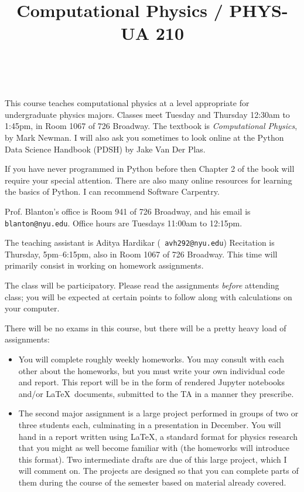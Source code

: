 \documentclass[11pt, preprint]{aastex}
\begin{document}
\title{\bf Computational Physics / PHYS-UA 210}
~
~

\noindent This course teaches computational physics at a level
appropriate for undergraduate physics majors.  Classes meet Tuesday
and Thursday 12:30am to 1:45pm, in Room 1067 of 726 Broadway.  The
textbook is {\it Computational Physics}, by Mark Newman. I will also
ask you sometimes to look online at the Python Data Science Handbook
(PDSH) by Jake Van Der Plas.

\noindent If you have never programmed in Python before then Chapter 2
of the book will require your special attention. There are also many
online resources for learning the basics of Python. I can recommend
Software Carpentry.

\noindent Prof. Blanton's office is Room 941 of 726 Broadway, and his
email is {\tt blanton@nyu.edu}.  Office hours are Tuesdays 11:00am to
12:15pm.

\noindent The teaching assistant is Aditya Hardikar ({\tt
  avh292@nyu.edu}) Recitation is Thursday, 5pm--6:15pm, also in Room
1067 of 726 Broadway. This time will primarily consist in working on
homework assignments.

\noindent The class will be participatory. Please read the assignments
          {\it before} attending class; you will be expected at
          certain points to follow along with calculations on your
          computer.

\noindent There will be no exams in this course, but there will be a
pretty heavy load of assignments:
\begin{itemize}
\item You will complete roughly weekly homeworks. You may consult with
  each other about the homeworks, but you must write your own
  individual code and report. This report will be in the form of
  rendered Jupyter notebooks and/or \LaTeX\ documents, submitted to
  the TA in a manner they prescribe.
\item The second major assignment is a large project performed in
  groups of two or three students each, culminating in a presentation
  in December. You will hand in a report written using \LaTeX, a
  standard format for physics research that you might as well become
  familiar with (the homeworks will introduce this format). Two
  intermediate drafts are due of this large project, which I will
  comment on. The projects are designed so that you can complete parts
  of them during the course of the semester based on
  material already covered. 
\end{itemize}
\end{document}
